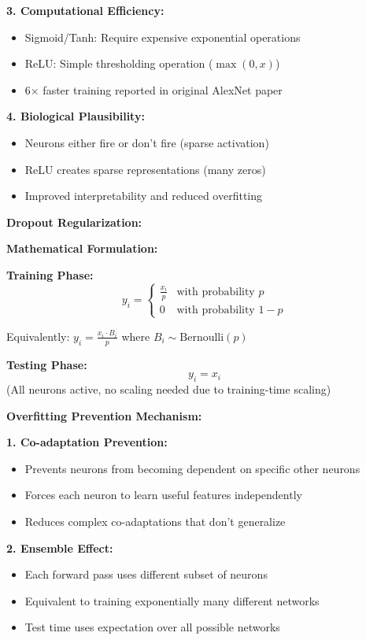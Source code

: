 \documentclass[12pt]{article}
\begin{document}
\begin{enumerate}[(a)]
{    \textbf{3. Computational Efficiency:}
    \begin{itemize}
        \item Sigmoid/Tanh: Require expensive exponential operations
        \item ReLU: Simple thresholding operation ($\max(0, x)$)
        \item 6× faster training reported in original AlexNet paper
    \end{itemize}
    
    \textbf{4. Biological Plausibility:}
    \begin{itemize}
        \item Neurons either fire or don't fire (sparse activation)
        \item ReLU creates sparse representations (many zeros)
        \item Improved interpretability and reduced overfitting
    \end{itemize}
    
    \textbf{Dropout Regularization:}
    
    \textbf{Mathematical Formulation:}
    
    \textbf{Training Phase:}
    $$y_i = \begin{cases} 
    \frac{x_i}{p} & \text{with probability } p \\
    0 & \text{with probability } 1-p
    \end{cases}$$
    
    Equivalently: $y_i = \frac{x_i \cdot B_i}{p}$ where $B_i \sim \text{Bernoulli}(p)$
    
    \textbf{Testing Phase:}
    $$y_i = x_i$$
    (All neurons active, no scaling needed due to training-time scaling)
    
    \textbf{Overfitting Prevention Mechanism:}
    
    \textbf{1. Co-adaptation Prevention:}
    \begin{itemize}
        \item Prevents neurons from becoming dependent on specific other neurons
        \item Forces each neuron to learn useful features independently
        \item Reduces complex co-adaptations that don't generalize
    \end{itemize}
    
    \textbf{2. Ensemble Effect:}
    \begin{itemize}
        \item Each forward pass uses different subset of neurons
        \item Equivalent to training exponentially many different networks
        \item Test time uses expectation over all possible networks
    \end{itemize}
    
}
\end{enumerate}
\end{document}
